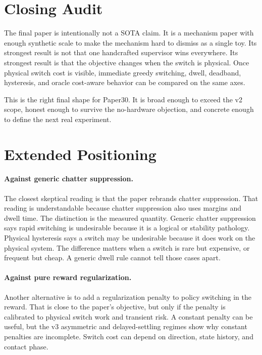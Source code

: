 \documentclass{article}
\begin{document}
\section{Closing Audit}

The final paper is intentionally not a SOTA claim.
It is a mechanism paper with enough synthetic scale to make the mechanism hard to dismiss as a single toy.
Its strongest result is not that one handcrafted supervisor wins everywhere.
Its strongest result is that the objective changes when the switch is physical.
Once physical switch cost is visible, immediate greedy switching, dwell, deadband, hysteresis, and oracle cost-aware behavior can be compared on the same axes.

This is the right final shape for Paper30.
It is broad enough to exceed the v2 scope, honest enough to survive the no-hardware objection, and concrete enough to define the next real experiment.

\section{Extended Positioning}

\paragraph{Against generic chatter suppression.}
The closest skeptical reading is that the paper rebrands chatter suppression.
That reading is understandable because chatter suppression also uses margins and dwell time.
The distinction is the measured quantity.
Generic chatter suppression says rapid switching is undesirable because it is a logical or stability pathology.
Physical hysteresis says a switch may be undesirable because it does work on the physical system.
The difference matters when a switch is rare but expensive, or frequent but cheap.
A generic dwell rule cannot tell those cases apart.

\paragraph{Against pure reward regularization.}
Another alternative is to add a regularization penalty to policy switching in the reward.
That is close to the paper's objective, but only if the penalty is calibrated to physical switch work and transient risk.
A constant penalty can be useful, but the v3 asymmetric and delayed-settling regimes show why constant penalties are incomplete.
Switch cost can depend on direction, state history, and contact phase.
\end{document}
